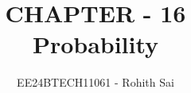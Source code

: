 \documentclass[journal]{IEEEtran}
\begin{document}

\vspace{3cm}

\title{CHAPTER - 16\\Probability}
\author{EE24BTECH11061 - Rohith Sai}
{\let\newpage\relax\maketitle}

\renewcommand{\thefigure}{\theenumi}
\renewcommand{\thetable}{\theenumi}
\setlength{\intextsep}{10pt} %

\renewcommand{\thetable}{\theenumi}
\end{document}
